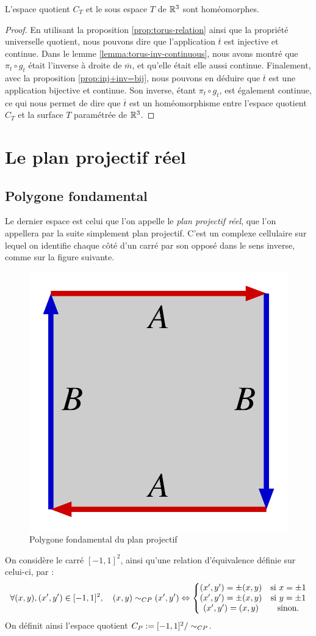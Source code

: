 \documentclass[hidelinks, 10pt]{article}
\begin{document}
\begin{theorem}\label{th:torus-homeo}
L'espace quotient $C_T$ et le sous espace $T$ de $\mathbb{R}^3$ sont homéomorphes.
\end{theorem}
\begin{proof}
En utilisant la proposition \ref{prop:torus-relation} ainsi que la propriété universelle quotient, nous pouvons dire que l'application $\overline{t}$ est injective et continue. Dans le lemme \ref{lemma:torus-inv-continuous}, nous avons montré que $\pi_t\circ g_t$ était l'inverse à droite de $\overline{m}$, et qu'elle était elle aussi continue. Finalement, avec la proposition \ref{prop:inj+inv=bij}, nous pouvons en déduire que $\overline{t}$ est une application bijective et continue. Son inverse, étant $\pi_t\circ g_t$, est également continue, ce qui nous permet de dire que $\overline{t}$ est un homéomorphisme entre l'espace quotient $C_T$ et la surface $T$ paramétrée de $\mathbb{R}^3$.
\end{proof}

\section{Le plan projectif réel}

\subsection{Polygone fondamental}

Le dernier espace est celui que l'on appelle le \emph{plan projectif réel}, que l'on appellera par la suite simplement plan projectif. C'est un complexe cellulaire sur lequel on identifie chaque côté d'un carré par son opposé dans le sens inverse, comme sur la figure suivante.

\begin{figure}[H]
    \centering
    \includegraphics[width=0.27\linewidth]{pictures/ProjectivePlaneAsSquare.svg.png}
    \caption{Polygone fondamental du plan projectif}
    \label{fig:P2R-as-square}
\end{figure}

\begin{definition}
On considère le carré $[-1,1]^2$, ainsi qu'une relation d'équivalence  définie sur celui-ci, par : \[\forall(x,y),(x',y')\in [-1,1]^2,\quad (x,y)\sim_{CP}(x',y')\Leftrightarrow \left\{\begin{matrix}
(x',y')=\pm(x,y)&\text{si }x=\pm1\\ 
(x',y')=\pm(x,y)&\text{si }y=\pm1\\ 
(x',y')=(x,y)&\text{sinon}.
\end{matrix}\right.\]On définit ainsi l'espace quotient $C_P:=[-1,1]^2/\sim_{CP}$.
\end{definition}
\end{document}

